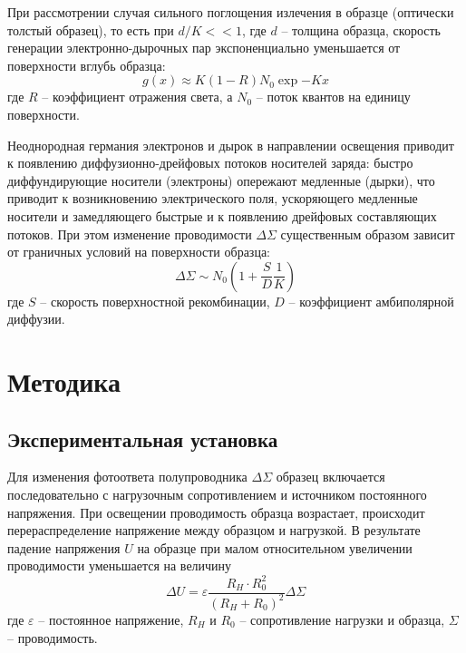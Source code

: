 \documentclass[a4paper, 14pt]{article}
\begin{document}
При рассмотрении случая сильного поглощения излечения в образце (оптически толстый образец), то есть при $d/K<<1$, где $d$ -- толщина образца, скорость генерации электронно-дырочных пар экспоненциально уменьшается от поверхности вглубь образца:
\begin{equation}
    g(x)\approx K(1-R)N_0\exp{-Kx}
\end{equation}
где $R$ -- коэффициент отражения света, а $N_0$ -- поток квантов на единицу поверхности.

Неоднородная германия электронов и дырок в направлении освещения приводит к появлению диффузионно-дрейфовых потоков носителей заряда: быстро диффундирующие носители (электроны) опережают медленные (дырки), что приводит к возникновению электрического поля, ускоряющего медленные носители и замедляющего быстрые и к появлению дрейфовых составляющих потоков. При этом изменение проводимости $\Delta\Sigma$ существенным образом зависит от граничных условий на поверхности образца:
\begin{equation}
    \Delta\Sigma\sim N_0\left(1+\frac{S}{D}\frac{1}{K}\right)
\end{equation}
где $S$ -- скорость поверхностной рекомбинации, $D$ -- коэффициент амбиполярной диффузии.


\section*{\textcolor{header}{Методика}}
\subsection*{\textcolor{sub_header}{Экспериментальная установка}}

Для изменения фотоответа полупроводника $\Delta\Sigma$ образец включается последовательно с нагрузочным сопротивлением и источником постоянного напряжения. При освещении проводимость образца возрастает, происходит перераспределение напряжение между образцом и нагрузкой. В результате падение напряжения $U$ на образце при малом относительном увеличении проводимости уменьшается на величину
    \begin{equation}
        \Delta U=\varepsilon\frac{R_H\cdot R_0^2}{(R_H+R_0)^2}\Delta\Sigma
        \label{eq:deltaU}
    \end{equation}
    где $\varepsilon$ -- постоянное напряжение, $R_H$ и $R_0$ -- сопротивление нагрузки и образца, $\Sigma$ -- проводимость.
\end{document}
